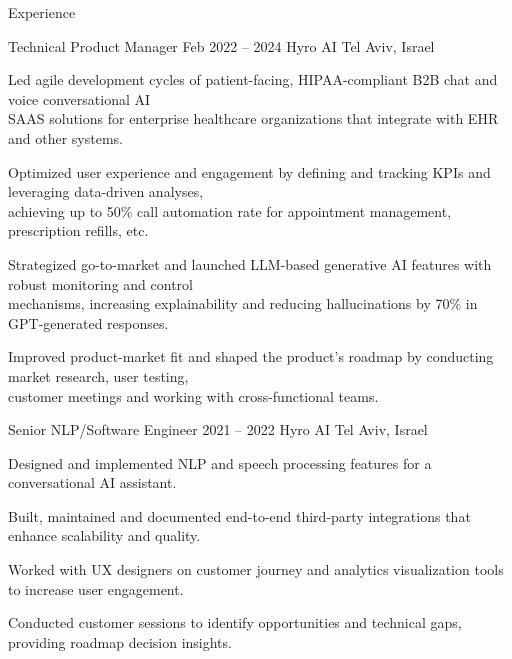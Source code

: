 \documentclass{resume} %
\begin{document}
\begin{rSection}{Experience}

\begin{rSubsection}
	{Technical Product Manager}
	{Feb 2022 -- 2024}
	{Hyro AI}
	{Tel Aviv, Israel}

	\setlength{\itemindent}{.5cm}
	
	
	
	\item Led agile development cycles of patient-facing, HIPAA-compliant B2B chat and voice conversational AI\\\hspace*{.5cm}SAAS solutions for enterprise healthcare organizations that integrate with EHR and other systems.
	\item Optimized user experience and engagement by defining and tracking KPIs and leveraging data-driven analyses,\\\hspace*{.5cm}achieving up to 50\% call automation rate for appointment management, prescription refills, etc.
	\item Strategized go-to-market and launched LLM-based generative AI features with robust monitoring and control\\\hspace*{.5cm}mechanisms, increasing explainability and reducing hallucinations by 70\% in GPT-generated responses.
	\item Improved product-market fit and shaped the product's roadmap by conducting market research, user testing,\\\hspace*{.5cm}customer meetings and working with cross-functional teams.
\end{rSubsection}

\begin{rSubsection}
	{Senior NLP/Software Engineer}
	{2021 -- 2022}
	{Hyro AI}
	{Tel Aviv, Israel}
	
	\setlength{\itemindent}{.5cm}
	
	\item Designed and implemented NLP and speech processing features for a conversational AI assistant.
	\item Built, maintained and documented end-to-end third-party integrations that enhance scalability and quality.
	\item Worked with UX designers on customer journey and analytics visualization tools to increase user engagement.
	\item Conducted customer sessions to identify opportunities and technical gaps, providing roadmap decision insights.
\end{rSubsection}


\end{rSection}
\end{document}
